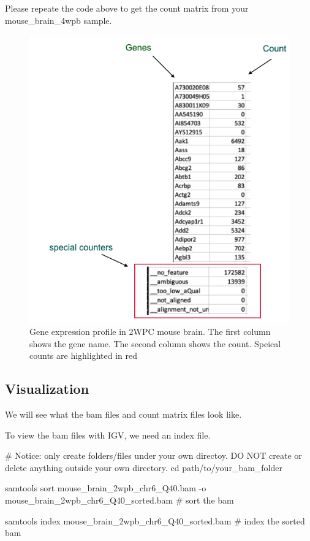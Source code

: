 \documentclass[
]{book}
\newenvironment{Shaded}{\begin{snugshade}}{\end{snugshade}}
\newcommand{\NormalTok}[1]{#1}
\begin{document}
Please repeate the code above to get the count matrix from your mouse\_brain\_4wpb sample.

\begin{figure}
\centering
\includegraphics{figures/count_matrix.png}
\caption{Gene expression profile in 2WPC mouse brain. The first column shows the gene name. The second column shows the count. Speical counts are highlighted in red}
\end{figure}

\hypertarget{visualization-2}{%
\subsection{Visualization}\label{visualization-2}}

We will see what the bam files and count matrix files look like.

To view the bam files with IGV, we need an index file.

\begin{Shaded}
\begin{Highlighting}[]
\NormalTok{\# Notice: only create folders/files under your own directoy. DO NOT create or delete anything outside your own directory.}
\NormalTok{cd  path/to/your\_bam\_folder}

\NormalTok{samtools sort mouse\_brain\_2wpb\_chr6\_Q40.bam {-}o mouse\_brain\_2wpb\_chr6\_Q40\_sorted.bam \# sort the bam}

\NormalTok{samtools index mouse\_brain\_2wpb\_chr6\_Q40\_sorted.bam \# index the sorted bam}
\end{Highlighting}
\end{Shaded}
\end{document}
